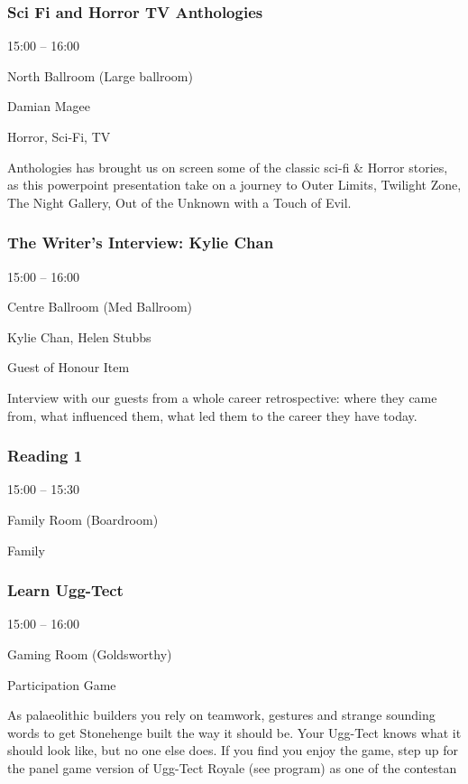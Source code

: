 \documentclass{scrreprt}
\begin{document}
\begin{multicols}{2}
\subsubsection*{Sci Fi and Horror TV Anthologies}\begin{description}
\setlength{\itemsep}{0pt}
\setlength{\parsep}{0pt}
\setlength{\parskip}{0pt}
\item[Time:]{15:00 -- 16:00}
\item[Venue:]{North Ballroom (Large ballroom)}
\item[People:]{Damian Magee}
\item[Tags:]{Horror, Sci-Fi, TV}\end{description}
Anthologies has brought us on screen some of the classic sci-fi \& Horror stories, as this powerpoint presentation take on a journey to Outer Limits, Twilight Zone, The Night Gallery, Out of the Unknown with a Touch of Evil.
\subsubsection*{The Writer's Interview: Kylie Chan}\begin{description}
\setlength{\itemsep}{0pt}
\setlength{\parsep}{0pt}
\setlength{\parskip}{0pt}
\item[Time:]{15:00 -- 16:00}
\item[Venue:]{Centre Ballroom (Med Ballroom)}
\item[People:]{Kylie Chan, Helen Stubbs}
\item[Tags:]{Guest of Honour Item}\end{description}
Interview with our guests from a whole career retrospective: where they came from, what influenced them, what led them to the career they have today.
\subsubsection*{Reading 1}\begin{description}
\setlength{\itemsep}{0pt}
\setlength{\parsep}{0pt}
\setlength{\parskip}{0pt}
\item[Time:]{15:00 -- 15:30}
\item[Venue:]{Family Room (Boardroom)}
\item[Tags:]{Family}\end{description}

\subsubsection*{Learn Ugg-Tect}\begin{description}
\setlength{\itemsep}{0pt}
\setlength{\parsep}{0pt}
\setlength{\parskip}{0pt}
\item[Time:]{15:00 -- 16:00}
\item[Venue:]{Gaming Room (Goldsworthy)}
\item[Tags:]{Participation Game}\end{description}
As palaeolithic builders you rely on teamwork, gestures and strange sounding words to get Stonehenge built the way it should be. Your Ugg-Tect knows what it should look like, but no one else does.  If you find you enjoy the game, step up for the panel game version of Ugg-Tect Royale (see program) as one of the contestan

\end{multicols}
\end{document}
